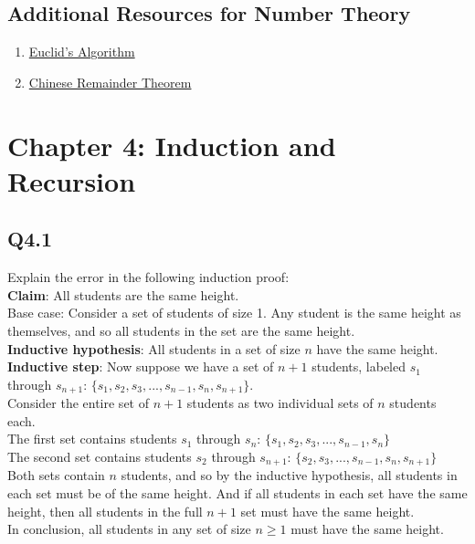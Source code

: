 \documentclass{article}
\begin{document}
\subsection*{Additional Resources for Number Theory}
\begin{enumerate}
    \item \href{https://www.youtube.com/watch?v=yHwneN6zJmU}{Euclid's Algorithm}
    \item \href{https://www.youtube.com/watch?v=ru7mWZJlRQg&t=276s}{Chinese Remainder Theorem} 
\end{enumerate}
\newpage

\section*{Chapter 4: Induction and Recursion}

\subsection*{Q4.1}
Explain the error in the following induction proof:
\\ \textbf{Claim}: All students are the same height.
\\ Base case: Consider a set of students of size 1. Any student is the same height as themselves, and so all students in the set are the same height.
\\ \textbf{Inductive hypothesis}: All students in a set of size $n$ have the same height. 
\\ \textbf{Inductive step}: Now suppose we have a set of $n+1$ students, labeled $s_1$ through $s_{n+1}$: $\{s_1,s_2,s_3,...,s_{n-1},s_n,s_{n+1}\}$.
\\ Consider the entire set of $n+1$ students as two individual sets of $n$ students each.
\\ The first set contains students $s_1$ through $s_n$: $\{s_1,s_2,s_3,...,s_{n-1},s_n\}$
\\ The second set contains students $s_2$ through $s_{n+1}$: $\{s_2,s_3,...,s_{n-1},s_n,s_{n+1}\}$
\\ Both sets contain $n$ students, and so by the inductive hypothesis, all students in each set must be of the same height. And if all students in each set have the same height, then all students in the full $n+1$ set must have the same height.
\\ In conclusion, all students in any set of size $n\geq1$ must have the same height.
\newpage
\end{document}
